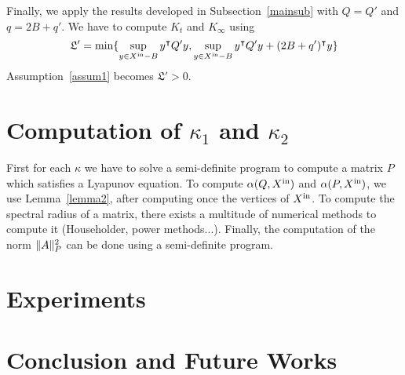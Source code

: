 \documentclass[10pt]{article}
\begin{document}
Finally, we apply the results developed in Subsection~\ref{mainsub} with $Q=Q'$ and $q=2B+q'$. We have to compute $K_t$ and $K_\infty$ using 
\[
\mathfrak{L}'=\min\{\sup_{y\in X^\mathrm{in}-B} y^\intercal Q' y,\sup_{y\in X^\mathrm{in}-B} y^\intercal Q' y+(2B+q')^\intercal y\}
\]
Assumption~\ref{assum1} becomes $\mathfrak{L}'>0$.
\section{Computation of $\kappa_1$ and $\kappa_2$}
\label{computations}
First for each $\kappa$ we have to solve a semi-definite program to compute a matrix $P$ which satisfies 
a Lyapunov equation.
To compute $\alpha(Q,X^\mathrm{in})$ and $\alpha(P,X^\mathrm{in})$, we use Lemma~\ref{lemma2}, after computing once the vertices of $X^\mathrm{in}$. 
To compute the spectral radius of a matrix, there exists a multitude of numerical methods to compute it (Householder, power methods...). Finally, the computation of the norm $\| A\|_P^2$ can be done using a semi-definite program.

\section{Experiments}

\section{Conclusion and Future Works} 


 
\end{document}
